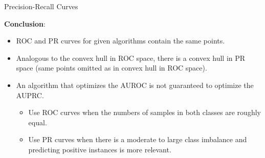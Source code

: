 \begin{vbframe}{Precision-Recall Curves}
%

\framebreak

\textbf{Conclusion}: \\

\begin{itemize}
  \item ROC and PR curves for given algorithms contain the same points.
  \item Analogous to the convex hull in ROC space, there is a convex hull in PR
  space (same points omitted as in convex hull in ROC space).
  \item An algorithm that optimizes the AUROC is not guaranteed to optimize
  the AUPRC.
  \begin{itemize}
    \item Use ROC curves when the numbers of samples in both classes are
    roughly equal.
    \item Use PR curves when there is a moderate to large class
    imbalance and predicting positive instances is more relevant.
  \end{itemize}
\end{itemize}
\end{vbframe}


